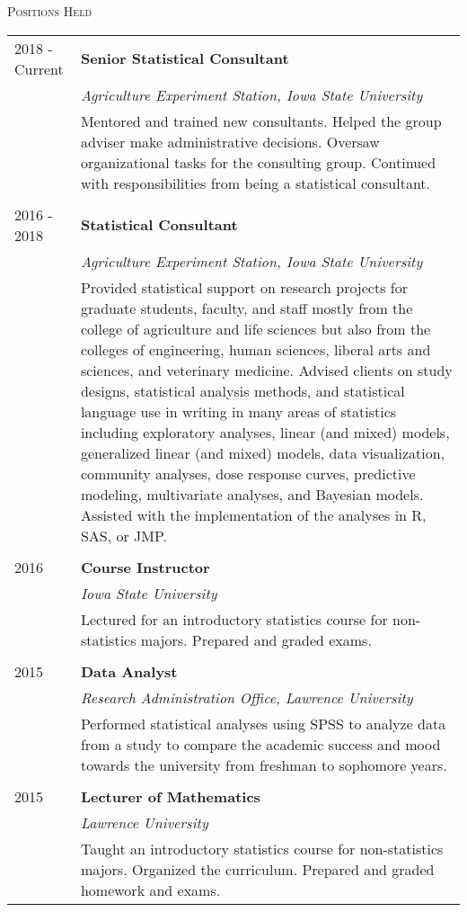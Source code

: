\documentclass[11pt, oneside]{article}
\begin{document}
\noindent \textsc{Positions Held} \hrulefill
\begin{longtable}{p{2.5cm}p{14cm}}
\hfill{2018 - Current} & \textbf{Senior Statistical Consultant}\\
& \emph{Agriculture Experiment Station, Iowa State University}\\
& Mentored and trained new consultants. Helped the group adviser make administrative decisions. Oversaw organizational tasks for the consulting group. Continued with responsibilities from being a statistical consultant.\\
\\
\hfill{2016 - 2018} & \textbf{Statistical Consultant}\\
& \emph{Agriculture Experiment Station, Iowa State University}\\
& Provided statistical support on research projects for graduate students, faculty, and staff mostly from the college of agriculture and life sciences but also from the colleges of engineering, human sciences, liberal arts and sciences, and veterinary medicine. Advised clients on study designs, statistical analysis methods, and statistical language use in writing in many areas of statistics including exploratory analyses, linear (and mixed) models, generalized linear (and mixed) models, data visualization, community analyses, dose response curves, predictive modeling, multivariate analyses, and Bayesian models. Assisted with the implementation of the analyses in R, SAS, or JMP.\\
\\
\hfill{2016} & \textbf{Course Instructor}\\
& \emph{Iowa State University}\\
& Lectured for an introductory statistics course for non-statistics majors. Prepared and graded exams.\\
\\
\hfill{2015} & \textbf{Data Analyst}\\
& \emph{Research Administration Office, Lawrence University}\\
& Performed statistical analyses using SPSS to analyze data from a study to compare the academic success and mood towards the university from freshman to sophomore years.\\
\\
\hfill{2015} & \textbf{Lecturer of Mathematics}\\
& \emph{Lawrence University}\\
& Taught an introductory statistics course for non-statistics majors. Organized the curriculum. Prepared and graded homework and exams.\\

\end{longtable}
\end{document}
